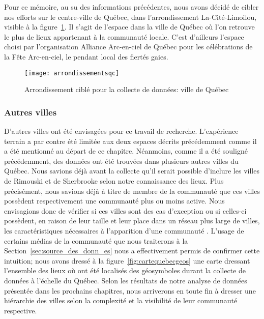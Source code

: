 Pour ce mémoire, au su des informations précédentes, nous avons décidé de cibler nos efforts sur le centre-ville de Québec, dans l'arrondissement La-Cité-Limoilou, visible à la figure~\ref{fig:arrondissementsqc}.
Il s'agit de l'espace dans la ville de Québec où l'on retrouve le plus de lieux appartenant à la communauté \lgbt{} locale.
C'est d'ailleurs l'espace choisi par l'organisation Alliance Arc-en-ciel de Québec pour les célébrations de la Fête Arc-en-ciel, le pendant local des fiertés gaies.

\begin{figure}[ht]
 \centering
 \texttt{[image: arrondissementsqc]}
 \caption[Arrondissement ciblé: ville de Québec]{Arrondissement ciblé pour la collecte de données: ville de Québec}\label{fig:arrondissementsqc}
\end{figure}

\subsubsection{Autres villes}
\label{ssub:autres_villes}

D'autres villes ont été envisagées pour ce travail de recherche.
L'expérience terrain a par contre été limitée aux deux espaces décrits précédemment comme il a été mentionné au départ de ce chapitre.
Néanmoins, comme il a été souligné précédemment, des données ont été trouvées dans plusieurs autres villes du Québec.
Nous savions déjà avant la collecte qu'il serait possible d'inclure les villes de Rimouski et de Sherbrooke selon notre connaissance des lieux.
Plus précisément, nous savions déjà à titre de membre de la communauté \lgbt{} que ces villes possèdent respectivement une communauté plus ou moins active.
Nous envisagions donc de vérifier si ces villes sont des cas d'exception ou si celles-ci possèdent, en raison de leur taille et leur place dans un réseau plus large de villes, les caractéristiques nécessaires à l'apparition d'une communauté \lgbt.
L'usage de certains médias de la communauté que nous traiterons à la Section~\ref{sec:source_des_donn_es} nous a effectivement permis de confirmer cette intuition; nous avons dressé à la figure~\ref{fig:cartequebecgeos} une carte dressant l'ensemble des lieux où ont été localisés des géosymboles durant la collecte de données à l'échelle du Québec.
Selon les résultats de notre analyse de données présentée dans les prochains chapitres, nous arriverons en toute fin à dresser une hiérarchie des villes selon la complexité et la visibilité de leur communauté respective.

